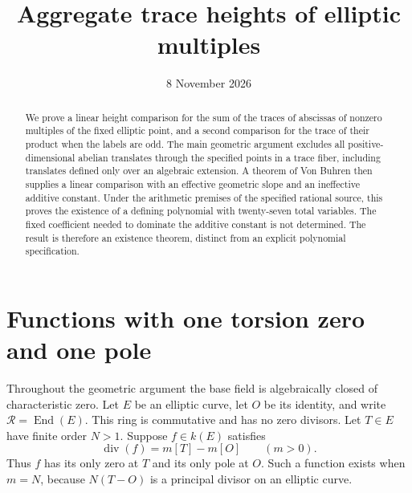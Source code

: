 \documentclass[11pt,a4paper]{article}
\title{Aggregate trace heights of elliptic multiples}
\author{}\date{8 November 2026}
\DeclareMathOperator{\End}{End}
\DeclareMathOperator{\divisor}{div}
\begin{document}
\maketitle
\begin{abstract}
We prove a linear height comparison for the sum of the traces of
abscissas of nonzero multiples of the fixed elliptic point, and a
second comparison for the trace of their product when the labels
are odd. The main
geometric argument excludes all positive-dimensional abelian
translates through the specified points in a trace fiber, including
translates defined only over an algebraic extension. A theorem of
Von Buhren then supplies a linear comparison with an effective
geometric slope and an ineffective additive constant. Under the
arithmetic premises of the specified rational source, this proves
the existence of a defining polynomial with twenty-seven total
variables. The fixed coefficient needed to dominate the additive
constant is not determined. The result is therefore an existence
theorem, distinct from an explicit polynomial specification.
\end{abstract}

\section{Functions with one torsion zero and one pole}

Throughout the geometric argument the base field is algebraically
closed of characteristic zero. Let $E$ be an elliptic curve, let
$O$ be its identity, and write $\mathcal R=\End(E)$. This ring is
commutative and has no zero divisors. Let $T\in E$ have finite
order $N>1$. Suppose $f\in k(E)$ satisfies
\[
 \divisor(f)=m[T]-m[O]\qquad(m>0).
\]
Thus $f$ has its only zero at $T$ and its only pole at $O$.
Such a function exists when $m=N$, because $N(T-O)$ is a
principal divisor on an elliptic curve.
\end{document}
